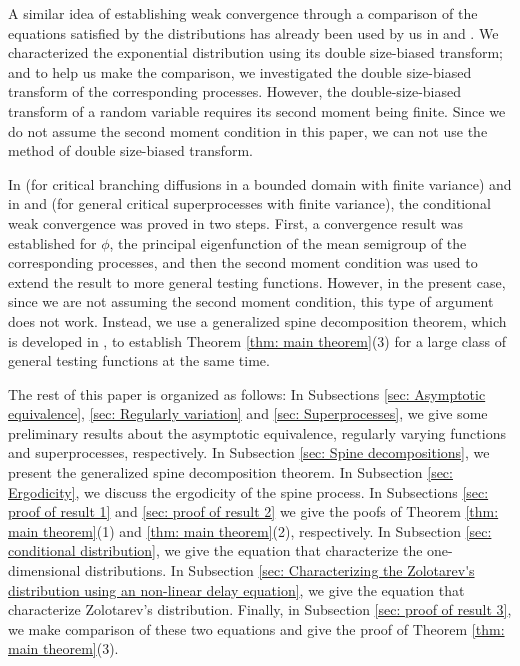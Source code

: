 \documentclass[12pt, a4paper]{amsart}
\theoremstyle{definition}
\numberwithin{equation}{section}
\begin{document}
	A similar idea of establishing weak convergence through a comparison of the equations satisfied by the distributions has already been used by us in \cite{RenSongSun2017A-2-spine} and \cite{RenSongSun2017Spine}.
	We characterized the exponential distribution using its double size-biased transform;
	and to help us make the comparison, we investigated the double size-biased transform of the corresponding processes.
	However, the double-size-biased transform of a random variable requires its second moment being finite.
	Since we do not assume the second moment condition in this paper, we can not use the method of double size-biased transform.
		
	In \cite{Powell2015An-invariance} (for critical branching diffusions in a bounded domain with finite variance) and in \cite{RenSongSun2017Spine} and \cite{RenSongZhang2015Limit} (for general critical superprocesses with finite variance), the conditional weak convergence was proved in two steps.
    First, a convergence result was established for $\phi$, the principal eigenfunction of the mean semigroup of the corresponding processes, and then the second moment condition was used to extend the result to more general testing functions.
	However, in the present case, since we are not assuming the second moment condition, this type of argument does not work.
	Instead, we use a generalized spine decomposition theorem, which is developed in \cite{RenSongSun2017Spine}, to establish Theorem \ref{thm: main theorem}(3) for a large class of general testing functions at the same time.

	The rest of this paper is organized as follows:
    In Subsections \ref{sec: Asymptotic equivalence}, \ref{sec: Regularly variation} and \ref{sec: Superprocesses}, we give some preliminary results about the asymptotic equivalence, regularly varying functions and superprocesses, respectively.
	In Subsection \ref{sec: Spine decompositions}, we present the generalized spine decomposition theorem.
	In Subsection \ref{sec: Ergodicity}, we discuss the ergodicity of the spine process.
    In Subsections \ref{sec: proof of result 1} and \ref{sec: proof of result 2} we give the poofs of Theorem \ref{thm: main theorem}(1) and \ref{thm: main theorem}(2), respectively.
    In Subsection \ref{sec: conditional distribution}, we give the equation that characterize the one-dimensional distributions.
    In Subsection \ref{sec: Characterizing the Zolotarev's distribution using an non-linear delay equation}, we give the equation that characterize Zolotarev's distribution.
	Finally, 
    in Subsection 
    \ref{sec: proof of result 3}, we make comparison of these two equations and give the proof of Theorem \ref{thm: main theorem}(3).
\end{document}
